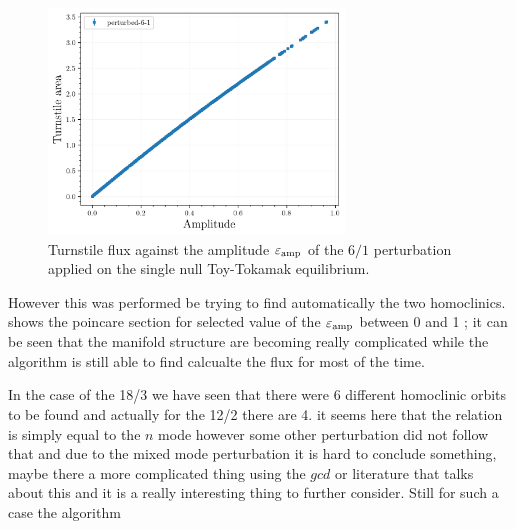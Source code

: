 \begin{figure}[H]
    \centering
    \includegraphics[width=0.7\textwidth]{images/amplitudescan/turnstile_area.png}
    \caption{Turnstile flux against the amplitude $\varepsilon_\text{amp}$ of the $6/1$ perturbation applied on the single null Toy-Tokamak equilibrium.}
    \label{fig:scan-6-1}
\end{figure}

However this was performed be trying to find automatically the two homoclinics.  shows the poincare section for selected value of the $\varepsilon_\text{amp}$ between 0 and 1 ; it can be seen that the manifold structure are becoming really complicated while the algorithm is still able to find calcualte the flux for most of the time.

In the case of the 18/3 we have seen that there were 6 different homoclinic orbits to be found and actually for the 12/2 there are 4. it seems here that the relation is simply equal to the $n$ mode however some other perturbation did not follow that and due to the mixed mode perturbation it is hard to conclude something, maybe there a more complicated thing using the $gcd$ or literature that talks about this and it is a really interesting thing to further consider. Still for such a case the algorithm 

